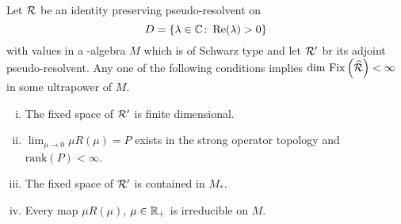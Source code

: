 \begin{theorem}\label{thm:d4-4.4}
Let $ \mathcal{R} $  be an identity preserving pseudo-resolvent on 
%
\[
	D = \{\lambda \in \mathbb{C} \colon  \mathop{}\!\mathrm{Re}(\lambda) > 0\} 
\]
%
with values in a \WA-algebra $ M $  which is of Schwarz type and let $ \mathcal{R}' $  br its adjoint pseudo-resolvent.
Any one of the following conditions implies $ \dim \mathop{}\mathrm{Fix}\left(\widehat{\mathcal{R}}\right) < \infty $  in some ultrapower of $ M $.
\begin{enumerate}[(i)]
\item
The fixed space of $ \mathcal{R}' $  is finite dimensional.

\item
$ \lim_{\mu \to 0} \mu R(\mu) = P $  exists in the strong operator topology and $ \text{rank}(P) < \infty $.

\item
The fixed space of $ \mathcal{R}' $  is contained in $ M_{*} $.

\item
Every map $ \mu R(\mu) $, $ \mu \in \mathbb{R}_{+} $ is irreducible on $ M $.
\end{enumerate}
\end{theorem}
